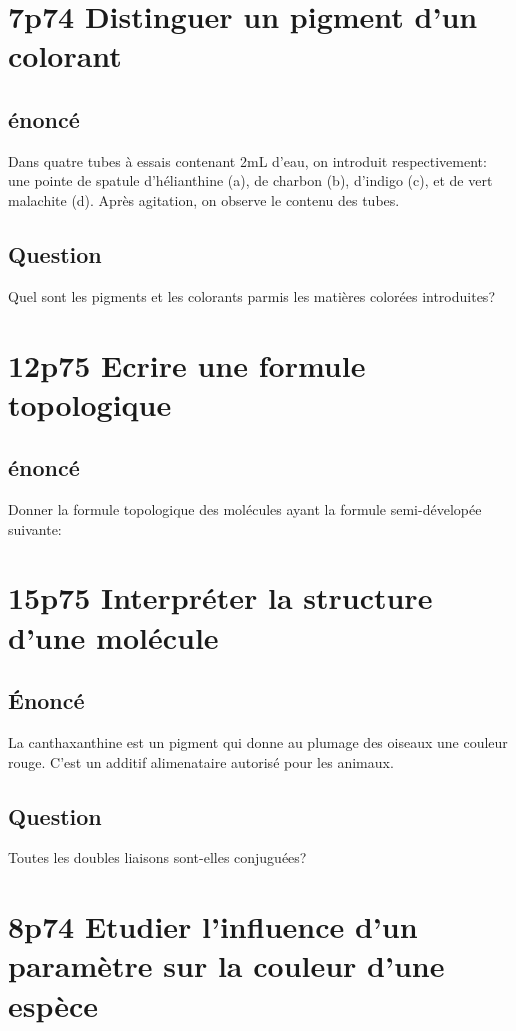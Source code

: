 \documentclass[11pt]{article}
\author{hatterer}
\date{\today}
\title{}
\begin{document}
\tableofcontents

\section{7p74 Distinguer un pigment d'un colorant}
\label{sec:orgheadline3}
\subsection{énoncé}
\label{sec:orgheadline1}
Dans quatre tubes à essais contenant 2mL d'eau, on introduit respectivement:
une pointe de spatule d'hélianthine (a),
de charbon (b),
d'indigo (c),
et de vert malachite (d).
Après agitation, on observe le contenu des tubes.
\subsection{Question}
\label{sec:orgheadline2}
Quel sont les pigments et les colorants parmis les matières colorées introduites?

\section{12p75 Ecrire une formule topologique}
\label{sec:orgheadline5}
\subsection{énoncé}
\label{sec:orgheadline4}
Donner la formule topologique des molécules ayant la formule semi-dévelopée suivante:

\section{15p75 Interpréter la structure d'une molécule}
\label{sec:orgheadline8}
\subsection{Énoncé}
\label{sec:orgheadline6}
La canthaxanthine est un pigment qui donne au plumage des oiseaux une couleur rouge.
C'est un additif alimenataire autorisé pour les animaux.
\subsection{Question}
\label{sec:orgheadline7}
Toutes les doubles liaisons sont-elles conjuguées?
\section{8p74 Etudier l'influence d'un paramètre sur la couleur d'une espèce}
\label{sec:orgheadline11}
\end{document}
